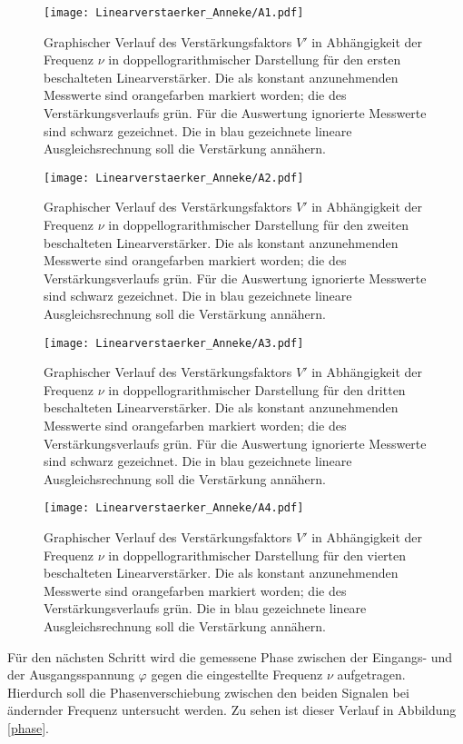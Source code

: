 \begin{figure}[h]
  \centering
  \texttt{[image: Linearverstaerker\_Anneke/A1.pdf]}
  \caption{Graphischer Verlauf des Verstärkungsfaktors $V'$ in Abhängigkeit der Frequenz $\nu$ in doppellograrithmischer Darstellung für den ersten beschalteten Linearverstärker. Die als konstant anzunehmenden Messwerte sind orangefarben markiert worden; die des Verstärkungsverlaufs grün. Für die Auswertung ignorierte Messwerte sind schwarz gezeichnet. Die in blau gezeichnete lineare Ausgleichsrechnung soll die Verstärkung annähern.}
  \label{linear1}
\end{figure}
\begin{figure}[h]
  \centering
  \texttt{[image: Linearverstaerker\_Anneke/A2.pdf]}
  \caption{Graphischer Verlauf des Verstärkungsfaktors $V'$ in Abhängigkeit der Frequenz $\nu$ in doppellograrithmischer Darstellung für den zweiten beschalteten Linearverstärker. Die als konstant anzunehmenden Messwerte sind orangefarben markiert worden; die des Verstärkungsverlaufs grün. Für die Auswertung ignorierte Messwerte sind schwarz gezeichnet.  Die in blau gezeichnete lineare Ausgleichsrechnung soll die Verstärkung annähern.}
  \label{linear2}
\end{figure}
\begin{figure}[h]
  \centering
  \texttt{[image: Linearverstaerker\_Anneke/A3.pdf]}
  \caption{Graphischer Verlauf des Verstärkungsfaktors $V'$ in Abhängigkeit der Frequenz $\nu$ in doppellograrithmischer Darstellung für den dritten beschalteten Linearverstärker. Die als konstant anzunehmenden Messwerte sind orangefarben markiert worden; die des Verstärkungsverlaufs grün. Für die Auswertung ignorierte Messwerte sind schwarz gezeichnet.  Die in blau gezeichnete lineare Ausgleichsrechnung soll die Verstärkung annähern.}
  \label{linear3}
\end{figure}
\begin{figure}[h]
  \centering
  \texttt{[image: Linearverstaerker\_Anneke/A4.pdf]}
  \caption{Graphischer Verlauf des Verstärkungsfaktors $V'$ in Abhängigkeit der Frequenz $\nu$ in doppellograrithmischer Darstellung für den vierten beschalteten Linearverstärker. Die als konstant anzunehmenden Messwerte sind orangefarben markiert worden; die des Verstärkungsverlaufs grün.  Die in blau gezeichnete lineare Ausgleichsrechnung soll die Verstärkung annähern.}
  \label{linear4}
\end{figure}
\clearpage
Für den nächsten Schritt wird die gemessene Phase zwischen der Eingangs- und der Ausgangsspannung $\varphi$ gegen die eingestellte Frequenz $\nu$ aufgetragen. Hierdurch soll die Phasenverschiebung zwischen den beiden Signalen bei ändernder Frequenz untersucht werden. Zu sehen ist dieser Verlauf in Abbildung \ref{phase}.
